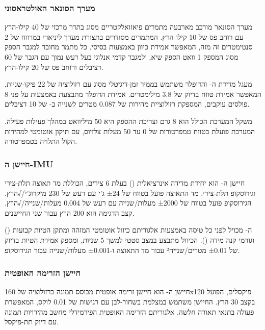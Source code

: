 \subsubsection{מערך הסונאר האולטראסוני}
\label{sec:ch07_sonar_array}

מערך הסונאר מורכב מארבעה מתמרים פיאזואלקטריים מסוג  בתדר מרכזי של 40 קילו-הרץ עם רוחב פס של 10 קילו-הרץ. המתמרים מסודרים בתצורת מערך ליניארי במרווח של 2 סנטימטרים זה מזה, המאפשר אמידת כיוון באמצעות  בסיסי. כל מתמר מחובר למגבר הספק מסוג  המספק 1 וואט הספק שיא, ולמגבר קדמי אנלוגי בעל רעש נמוך עם הגבר של 60 דציבלים ורוחב פס של 20 קילו-הרץ.

מעגל מדידת ה- והדופלר משתמש בממיר זמן-דיגיטלי מסוג  עם רזולוציה של 22 פיקו-שניות, המאפשר אמידת טווח בדיוק של 3.8 מילימטרים. אמידת הדופלר מתבצעת באמצעות  על פני 8 פולסים עוקבים, המספקת רזולוציית מהירות של 0.087 מטרים לשנייה ב- של 10 דציבלים.

משקל המערכת הכולל הוא 8 גרם וצריכת ההספק היא 50 מיליוואט במהלך פעילות פעילה. המערכת פועלת בטווח טמפרטורות של 0 עד 50 מעלות צלזיוס, עם תיקון אוטומטי למהירות הקול התלויה בטמפרטורה.

\subsubsection{חיישן ה-IMU}
\label{sec:ch07_imu}

חיישן ה- הוא יחידת מדידה אינרציאלית () בעלת 6 צירים, הכוללת מד תאוצה תלת-צירי וגירוסקופ תלת-צירי. מד התאוצה פועל בטווח של ±24 ג'י עם רעש של 230 מיקרוג'י/√הרץ. הגירוסקופ פועל בטווח של ±2000 מעלות/שנייה עם רעש של 0.004 מעלות/שנייה/√הרץ. קצב הדגימה הוא 200 הרץ עבור שני החיישנים.

ה- מכויל לפני כל טיסה באמצעות אלגוריתם כיוול אוטומטי המזהה ומתקן הטיות קבועות () וגורמי קנה מידה (). הכיוול מתבצע במצב סטטי למשך 5 שניות, ומספק אמידת הטיות בדיוק של ±0.01 מטרים/שנייה² עבור מד התאוצה ו-±0.001 מעלות/שנייה עבור הגירוסקופ.

\subsubsection{חיישן הזרימה האופטית}
\label{sec:ch07_optical_flow}

חיישן ה- הוא חיישן זרימה אופטית מבוסס תמונה ברזולוציה של 160x120 פיקסלים, הפועל בקצב 30 הרץ. החיישן משתמש במצלמת  בשחור-לבן עם רגישות של 0.01 לוקס, המאפשרת פעולה בתנאי תאורה חלשה. אלגוריתם הזרימה האופטית  הפירמידלי מחשב מהירויות תמונה עם דיוק תת-פיקסל.

